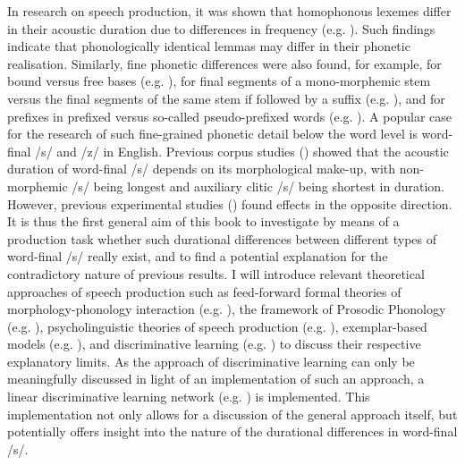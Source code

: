 In research on speech production, it was shown that homophonous lexemes differ in their acoustic duration due to differences in frequency (e.g. \cite{Jurafsky2002, Lavoie2002, Gahl2008, Drager2011, Lohmann2018}). Such findings indicate that phonologically identical lemmas may differ in their phonetic realisation. Similarly, fine phonetic differences were also found, for example, for bound versus free bases (e.g. \cite{Kemps2005a, Kemps2005b}), for final segments of a mono-morphemic stem versus the final segments of the same stem if followed by a suffix (e.g. \cite{Sugahara2004, Sugahara2009}), and for prefixes in prefixed versus so-called pseudo-prefixed words (e.g. \cite{Smith2012}). A popular case for the research of such fine-grained phonetic detail below the word level is word-final /s/ and /z/ in English. Previous corpus studies (\cite{Zimmermann2016, Plag2017, Tomaschek2019}) showed that the acoustic duration of word-final /s/ depends on its morphological make-up, with non-morphemic /s/ being longest and auxiliary clitic /s/ being shortest in duration. However, previous experimental studies (\cite{Walsh1983, Hsieh1999, Seyfarth2017}) found effects in the opposite direction. It is thus the first general aim of this book to investigate by means of a production task whether such durational differences between different types of word-final /s/ really exist, and to find a potential explanation for the contradictory nature of previous results. I will introduce relevant theoretical approaches of speech production such as feed-forward formal theories of morphology-phonology interaction (e.g. \cite{Chomsky1968, Kiparsky1982}), the framework of Prosodic Phonology (e.g. \cite{Booij1983, Nespor2007}), psycholinguistic theories of speech production (e.g. \cite{Levelt1999, Roelofs2019}), exemplar-based models (e.g. \cite{Goldinger1998, Pierrehumbert2001, Gahl2006}), and discriminative learning (e.g. \cite{Rescorla1988, Ramscar2007, Ramscar2010}) to discuss their respective explanatory limits. As the approach of discriminative learning can only be meaningfully discussed in light of an implementation of such an approach, a linear discriminative learning network (e.g. \cite{Baayen2019}) is implemented. This implementation not only allows for a discussion of the general approach itself, but potentially offers insight into the nature of the durational differences in word-final /s/.

